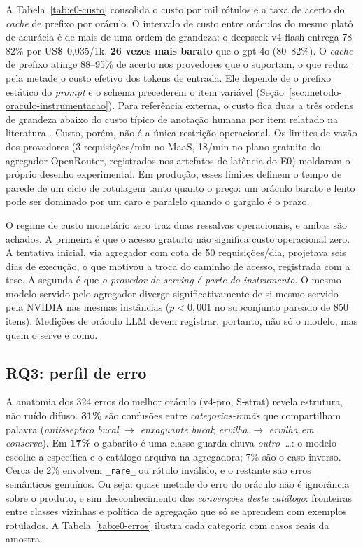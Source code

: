 A Tabela~\ref{tab:e0-custo} consolida o custo por mil rótulos e a taxa de
acerto do \textit{cache} de prefixo por oráculo. O intervalo de custo entre
oráculos do mesmo platô de acurácia é de mais de
uma ordem de grandeza: o deepseek-v4-flash entrega 78--82\% por
US\$~0,035/1k, \textbf{26 vezes mais barato} que o gpt-4o (80--82\%). O \textit{cache} de prefixo atinge 88--95\% de acerto nos provedores que o
suportam, o que reduz pela metade o custo efetivo dos tokens de entrada. Ele
depende de o prefixo estático do \textit{prompt} e o schema precederem o item
variável (Seção~\ref{sec:metodo-oraculo-instrumentacao}). Para referência externa, o custo fica
duas a três ordens de grandeza abaixo do custo típico de anotação humana por
item relatado na literatura \citep{Gilardi2023}. Custo, porém, não é a única restrição operacional. Os limites de vazão dos
provedores (3 requisições/min no MaaS, 18/min no plano gratuito do agregador
OpenRouter, registrados nos artefatos de latência do E0) moldaram o próprio
desenho experimental. Em produção, esses limites definem o tempo de parede de um
ciclo de rotulagem tanto quanto o preço: um oráculo barato e lento pode ser
dominado por um caro e paralelo quando o gargalo é o prazo.

O regime de custo monetário zero traz duas ressalvas operacionais, e ambas
são achados. A primeira é que o acesso gratuito não significa custo
operacional zero. A tentativa inicial, via
agregador com cota de 50 requisições/dia, projetava seis dias de execução, o
que motivou a troca do caminho de acesso, registrada com a tese. A segunda é
que \emph{o provedor de
\textit{serving} é parte do instrumento}. O mesmo modelo servido pelo agregador
diverge significativamente de si mesmo servido pela NVIDIA nas mesmas
instâncias ($p<0{,}001$ no subconjunto pareado de 850 itens). Medições de oráculo LLM devem registrar, portanto, não só o modelo, mas
quem o serve e como.

\subsection{RQ3: perfil de erro}
\label{sec:res-e0-rq3}

A anatomia dos 324 erros do melhor oráculo (v4-pro, S-strat) revela estrutura,
não ruído difuso. \textbf{31\%} são confusões entre \emph{categorias-irmãs} que
compartilham palavra (\textit{antisseptico bucal} $\to$ \textit{enxaguante
bucal}; \textit{ervilha} $\to$ \textit{ervilha em conserva}). Em \textbf{17\%} o
gabarito é uma classe guarda-chuva \textit{outro~\ldots}: o modelo escolhe a
específica e o catálogo arquiva na agregadora; 7\% são o caso inverso. Cerca
de 2\% envolvem \texttt{\_rare\_} ou rótulo inválido, e o restante são
erros semânticos genuínos. Ou seja: quase metade do erro do
oráculo não é ignorância sobre o produto, e sim desconhecimento das
\emph{convenções deste catálogo}: fronteiras entre classes vizinhas e
política de agregação que só se aprendem com exemplos rotulados. A
Tabela~\ref{tab:e0-erros} ilustra cada categoria com casos reais da amostra.

